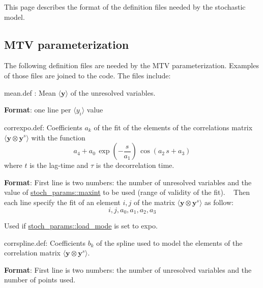 This page describes the format of the definition files needed by the stochastic model.

\subsection*{M\+TV parameterization}

The following definition files are needed by the M\+TV parameterization. Examples of those files are joined to the code. The files include\+:
\begin{DoxyItemize}
\item \textquotesingle{}mean.\+def\textquotesingle{} \+: Mean $\langle \boldsymbol y \rangle$ of the unresolved variables.
\begin{DoxyItemize}
\item {\bfseries Format}\+: one line per $\langle y_i \rangle$ value
\end{DoxyItemize}
\item \textquotesingle{}correxpo.\+def\textquotesingle{}\+: Coefficients $a_k$ of the fit of the elements of the correlations matrix $\langle \boldsymbol y \otimes \boldsymbol y^s \rangle$ with the function \[ a_4+a_0 \, \exp\left(-\frac{s}{a_1}\right) \, \cos(a_2 \, s + a_3) \] where $t$ is the lag-\/time and $\tau$ is the decorrelation time.
\begin{DoxyItemize}
\item {\bfseries Format}\+: First line is two numbers\+: the number of unresolved variables and the value of \hyperlink{namespacestoch__params_a50976593e79387f25e08fef6ce56b30b}{stoch\+\_\+params\+::maxint} to be used (range of validity of the fit). ~\newline
 Then each line specify the fit of an element $i,j$ of the matrix $\langle \boldsymbol y \otimes \boldsymbol y^s \rangle$ as follow\+: \[ i,j,a_0,a_1,a_2,a_3\]
\item Used if \hyperlink{namespacestoch__params_ac61a48744a1bb015b5148c421837fbe7}{stoch\+\_\+params\+::load\+\_\+mode} is set to \textquotesingle{}expo\textquotesingle{}.
\end{DoxyItemize}
\item \textquotesingle{}corrspline.\+def\textquotesingle{}\+: Coefficients $b_k$ of the spline used to model the elements of the correlation matrix $\langle \boldsymbol y \otimes \boldsymbol y^s \rangle$.
\begin{DoxyItemize}
\item {\bfseries Format}\+: First line is two numbers\+: the number of unresolved variables and the number of points used. ~\newline

\end{DoxyItemize}
\end{DoxyItemize}
